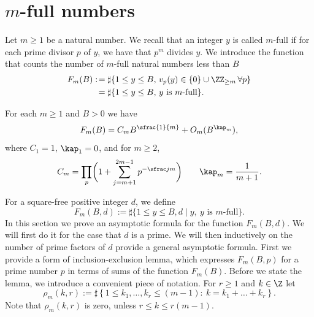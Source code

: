 \section{\texorpdfstring{$m$}{m}-full numbers}
\label{sec:m-full}
Let $m\geq 1$ be a natural number. We recall that an integer $y$ is called $m$-full if for each prime divisor $p$ of $y$, we have that $p^m$ divides $y$.
We introduce the function that counts the number of $m$-full natural numbers less than $B$
\begin{equation*}
\begin{split}
F_m(B):\!&=\sharp\{1\leq y\leq B,\, v_p(y)\in\{0\}\cup\ZZ_{\geq m}\,\forall p\}\\
&= \sharp\{1\leq y\leq B,\, y \mbox{ is $m$-full}\}.
\end{split}
\end{equation*}

\begin{lemma}
For each $m\geq 1$ and $B>0$ we have
\begin{equation}\label{eqnm}
F_m(B)=C_mB^{\sfrac{1}{m}}+O_m(B^{\kap_m}),
\end{equation}
where $C_1=1$, $\kap_1=0$, and for $m\geq 2$,
\begin{equation}
\label{eq:C_m_explicit}
C_m=\prod_p\biggl(1+\sum_{j=m+1}^{2m-1}p^{-\sfrac jm}\biggr) \qquad
\kap_m=\frac1{m+1}.
\end{equation}
\end{lemma}

For a square-free positive integer $d$, we define
\begin{equation}
\label{eq:FmBd_defin}
F_m(B,d):= \sharp\{1\leq y\leq B, d\mid y,\ y\mbox{ is $m$-full}\}.
\end{equation}
In this section we prove an asymptotic formula for the function $F_m(B,d)$.
We will first do it for the case that $d$ is a prime. We will then inductively on the number of prime factors of $d$ provide a general asymptotic formula.
First we provide a form of inclusion-exclusion lemma, which expresses $F_m(B,p)$ for a prime number $p$ in terms of sums of the function $F_m(B)$. Before we state the lemma, we introduce a convenient piece of notation. For $r\geq 1$ and $k\in \Z$ let
\[
\rho_m(k,r):= \sharp\left\{1\leq k_1,\ldots, k_r\leq (m-1):\ k=k_1+\ldots + k_r\right\}.
\]
Note that $\rho_m(k,r)$ is zero, unless $r\leq k\leq r(m-1)$.\par


